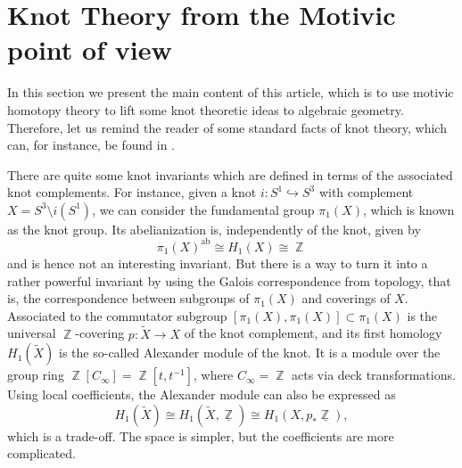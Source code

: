 \documentclass[english]{amsart}
\theoremstyle{definition}
\DeclareMathOperator{\Z}{\mathbb{Z}}
\DeclareMathOperator{\ab}{ab}
\begin{document}
\section{Knot Theory from the Motivic point of view}\label{Section 4}
In this section we present the main content of this article, which is to use motivic homotopy theory to lift some knot theoretic ideas to algebraic geometry. Therefore, let us remind the reader of some standard facts of knot theory, which can, for instance, be found in \cite{MR3156509}.

\hfill

There are quite some knot invariants which are defined in terms of the associated knot complements. For instance, given a knot $i \colon S^1 \hookrightarrow S^3$ with complement $X = S^3 \setminus i(S^1)$, we can consider the fundamental group $\pi_1(X)$, which is known as the knot group. Its abelianization is, independently of the knot, given by 
$$\pi_1(X)^{\ab} \cong H_1(X) \cong \Z$$
and is hence not an interesting invariant. But there is a way to turn it into a rather powerful invariant by
using the Galois correspondence from topology, that is, the correspondence between subgroups of $\pi_1(X)$ and coverings of $X$. Associated to the commutator subgroup $[\pi_1(X), \pi_1(X)] \subset \pi_1(X)$ is the universal $\Z$-covering $p \colon \widetilde{X} \rightarrow X$ of the knot complement, and its first homology $H_1(\widetilde{X})$ is the so-called Alexander module of the knot. It is a module over the group ring $\Z[C_\infty] = \Z[t,t^{-1}]$, where $C_\infty = \Z$ acts via deck transformations. Using local coefficients, the Alexander module can also be expressed as
$$H_1(\widetilde{X}) \cong H_1(\widetilde{X}, \underline{\Z}) \cong H_1(X,p_*\underline{\Z}),$$
which is a trade-off. The space is simpler, but the coefficients are more complicated.

\hfill
\end{document}
